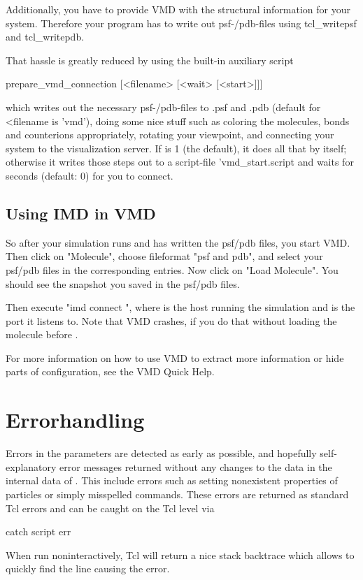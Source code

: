 Additionally, you have to provide VMD with the structural information
for your system. Therefore your program has to write out
psf-/pdb-files using tcl\_writepsf and tcl\_writepdb.

That hassle is greatly reduced by using the built-in auxiliary script
\begin{code}
prepare\_vmd\_connection [<filename> [<wait> [<start>]]]
\end{code}

which writes out the necessary psf-/pdb-files to .psf
and .pdb (default for <filename is 'vmd'), doing some
nice stuff such as coloring the molecules, bonds and counterions
appropriately, rotating your viewpoint, and connecting your system to
the visualization server. If  is 1 (the default), it does
all that by itself; otherwise it writes those steps out to a
script-file 'vmd\_start.script and waits for  seconds
(default: 0) for you to connect.

\subsection{Using IMD in VMD}
So after your simulation runs and has written the psf/pdb files, you
start VMD. Then click on "Molecule", choose fileformat "psf and pdb",
and select your psf/pdb files in the corresponding entries. Now click
on "Load Molecule". You should see the snapshot you saved in the
psf/pdb files.

Then execute "imd connect  ", where  is
the host running the simulation and  is the port it listens
to. Note that VMD crashes, if you do that without loading the molecule
before .

For more information on how to use VMD to extract more information or
hide parts of configuration, see the VMD Quick Help.

\section{Errorhandling}
Errors in the parameters are detected as early as possible, and
hopefully self-explanatory error messages returned without any changes
to the data in the internal data of \es. This include errors such as
setting nonexistent properties of particles or simply misspelled
commands. These errors are returned as standard Tcl errors and can be
caught on the Tcl level via
\begin{tclcode}
catch {script} err 
\end{tclcode}
When run noninteractively, Tcl will return a nice stack backtrace
which allows to quickly find the line causing the error.


